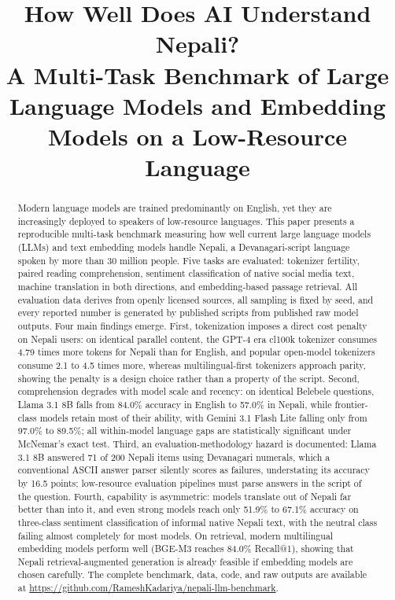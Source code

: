 \documentclass[conference]{IEEEtran}
\begin{document}
\title{How Well Does AI Understand Nepali?\\
A Multi-Task Benchmark of Large Language Models and Embedding Models on a Low-Resource Language}

\author{
}

\maketitle

\begin{abstract}
Modern language models are trained predominantly on English, yet they are increasingly deployed to speakers of low-resource languages. This paper presents a reproducible multi-task benchmark measuring how well current large language models (LLMs) and text embedding models handle Nepali, a Devanagari-script language spoken by more than 30 million people. Five tasks are evaluated: tokenizer fertility, paired reading comprehension, sentiment classification of native social media text, machine translation in both directions, and embedding-based passage retrieval. All evaluation data derives from openly licensed sources, all sampling is fixed by seed, and every reported number is generated by published scripts from published raw model outputs. Four main findings emerge. First, tokenization imposes a direct cost penalty on Nepali users: on identical parallel content, the GPT-4 era cl100k tokenizer consumes 4.79 times more tokens for Nepali than for English, and popular open-model tokenizers consume 2.1 to 4.5 times more, whereas multilingual-first tokenizers approach parity, showing the penalty is a design choice rather than a property of the script. Second, comprehension degrades with model scale and recency: on identical Belebele questions, Llama 3.1 8B falls from 84.0\% accuracy in English to 57.0\% in Nepali, while frontier-class models retain most of their ability, with Gemini 3.1 Flash Lite falling only from 97.0\% to 89.5\%; all within-model language gaps are statistically significant under McNemar's exact test. Third, an evaluation-methodology hazard is documented: Llama 3.1 8B answered 71 of 200 Nepali items using Devanagari numerals, which a conventional ASCII answer parser silently scores as failures, understating its accuracy by 16.5 points; low-resource evaluation pipelines must parse answers in the script of the question. Fourth, capability is asymmetric: models translate out of Nepali far better than into it, and even strong models reach only 51.9\% to 67.1\% accuracy on three-class sentiment classification of informal native Nepali text, with the neutral class failing almost completely for most models. On retrieval, modern multilingual embedding models perform well (BGE-M3 reaches 84.0\% Recall@1), showing that Nepali retrieval-augmented generation is already feasible if embedding models are chosen carefully. The complete benchmark, data, code, and raw outputs are available at \url{https://github.com/RameshKadariya/nepali-llm-benchmark}.

\end{abstract}
\end{document}
